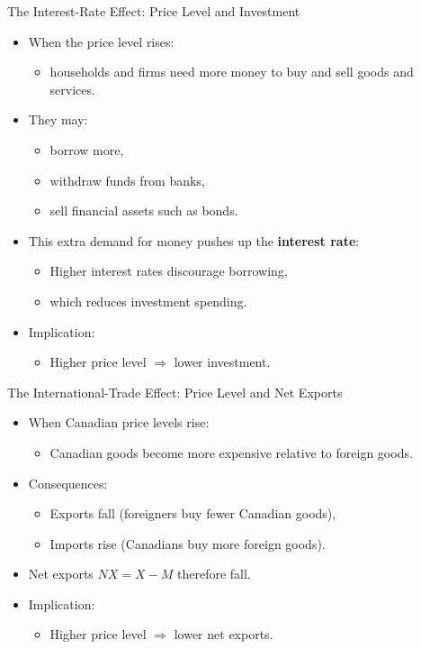 \documentclass[aspectratio=169]{beamer}
\begin{document}
\begin{frame}{The Interest-Rate Effect: Price Level and Investment}
\transfade
\begin{itemize}
  \item When the price level rises:
  \begin{itemize}
    \item households and firms need more money to buy and sell goods and services.
  \end{itemize}
  \item They may:
  \begin{itemize}
    \item borrow more,
    \item withdraw funds from banks,
    \item sell financial assets such as bonds.
  \end{itemize}
  \item This extra demand for money pushes up the \textbf{interest rate}:
  \begin{itemize}
    \item Higher interest rates discourage borrowing,
    \item which reduces investment spending.
  \end{itemize}
  \item Implication:
  \begin{itemize}
    \item \alert{Higher price level} \(\Rightarrow\) \alert{lower investment}.
  \end{itemize}
\end{itemize}
\end{frame}

\begin{frame}{The International-Trade Effect: Price Level and Net Exports}
\transfade
\begin{itemize}
  \item When Canadian price levels rise:
  \begin{itemize}
    \item Canadian goods become more expensive relative to foreign goods.
  \end{itemize}
  \item Consequences:
  \begin{itemize}
    \item Exports fall (foreigners buy fewer Canadian goods),
    \item Imports rise (Canadians buy more foreign goods).
  \end{itemize}
  \item Net exports \(NX = X - M\) therefore fall.
  \item Implication:
  \begin{itemize}
    \item \alert{Higher price level} \(\Rightarrow\) \alert{lower net exports}.
  \end{itemize}
\end{itemize}
\end{frame}
\end{document}
